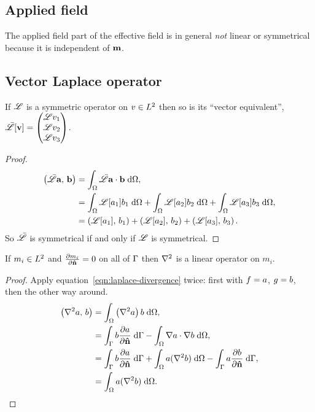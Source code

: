 \subsection{Applied field}

The applied field part of the effective field is in general \emph{not} linear or symmetrical because it is independent of $\boldsymbol{\mathrm{m}}$.

\subsection{Vector Laplace operator}

\begin{theorem}
  If $\mathscr{L}$ is a symmetric operator on $v \in {L^2}$ then so is its ``vector equivalent'', $\bar{\mathscr{L}}[{\boldsymbol{\mathrm{v}}}] = \begin{pmatrix} \mathscr{L} v_1 \\ \mathscr{L} v_2 \\ \mathscr{L} v_3 \end{pmatrix}$.
\end{theorem}

\begin{proof}
  \begin{equation}
    \begin{aligned}
      \left(\bar{\mathscr{L}}{\boldsymbol{\mathrm{a}}},\, {\boldsymbol{\mathrm{b}}} \right) &= {\int_{\Omega} { \bar{\mathscr{L}} {\boldsymbol{\mathrm{a}}} \cdot {\boldsymbol{\mathrm{b}}}} {\; \mathrm{{d}}} {\Omega}}, \\
      &= {\int_{\Omega} {\mathscr{L}[a_1] b_1} {\; \mathrm{{d}}} {\Omega}} + {\int_{\Omega} {\mathscr{L}[a_2] b_2} {\; \mathrm{{d}}} {\Omega}} + {\int_{\Omega} {\mathscr{L}[a_3] b_3} {\; \mathrm{{d}}} {\Omega}}, \\
      & = \left(\mathscr{L}[a_1],\, b_1 \right) + \left(\mathscr{L}[a_2],\, b_2 \right) + \left(\mathscr{L}[a_3],\, b_3 \right).
    \end{aligned}
  \end{equation}
  So $\bar{\mathscr{L}}$ is symmetrical if and only if $\mathscr{L}$ is symmetrical.
\end{proof}

\begin{theorem}
  If $m_i \in {L^2}$ and $\frac{\partial m_i}{\partial \boldsymbol{\mathrm{\hat{n}}}} = 0$ on all of ${\Gamma}$ then $\nabla^2$ is a linear operator on $m_i$.
\end{theorem}
\begin{proof}
  Apply equation~\cref{eqn:laplace-divergence} twice: first with $f = a$, $g = b$, then the other way around.
  \begin{equation}
    \begin{aligned}
      \label{eq:93}
      \ip{\lap a}{b} &= \intd{\left(\lap a \right) b}, \\
      &= \intb{b \ddn{a}} - \intd{\grad a \cdot \grad b}, \\
      &= \intb{b \ddn{a}} + \intd{a (\lap b)} - \intb{a \ddn{b}}, \\
      &= \intd{a (\lap b)}.
    \end{aligned}
  \end{equation}
\end{proof}

